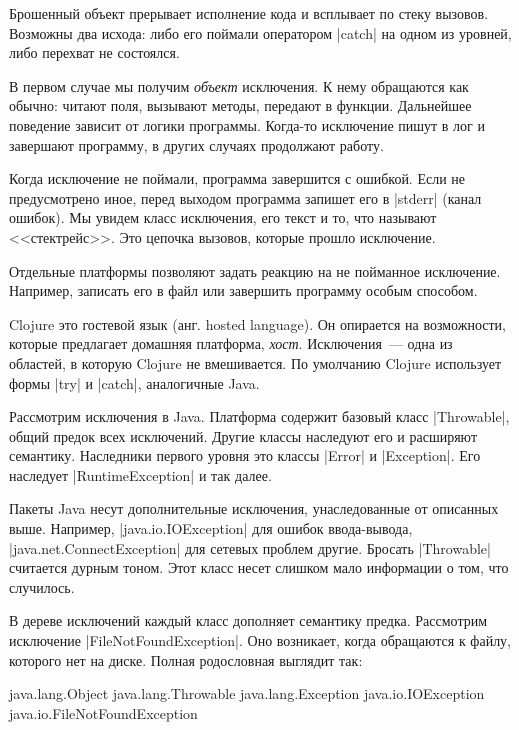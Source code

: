 Брошенный объект прерывает исполнение кода и всплывает по стеку
вызовов. Возможны два исхода: либо его поймали оператором \spverb|catch| на
одном из уровней, либо перехват не состоялся.

В первом случае мы получим \emph{объект} исключения. К нему обращаются как
обычно: читают поля, вызывают методы, передают в функции. Дальнейшее поведение
зависит от логики программы. Когда-то исключение пишут в лог и завершают
программу, в других случаях продолжают работу.

Когда исключение не поймали, программа завершится с ошибкой. Если не
предусмотрено иное, перед выходом программа запишет его в \spverb|stderr| (канал
ошибок). Мы увидем класс исключения, его текст и то, что называют
<<стектрейс>>. Это цепочка вызовов, которые прошло исключение.

Отдельные платформы позволяют задать реакцию на не пойманное
исключение. Например, записать его в файл или завершить программу особым
способом.

Clojure это гостевой язык (анг. hosted language). Он опирается на возможности,
которые предлагает домашняя платформа, \emph{хост}.  Исключения~--- одна из
областей, в которую Clojure не вмешивается. По умолчанию Clojure использует
формы \spverb|try| и \spverb|catch|, аналогичные Java.

Рассмотрим исключения в Java. Платформа содержит базовый класс
\spverb|Throwable|, общий предок всех исключений. Другие классы наследуют его и
расширяют семантику. Наследники первого уровня это классы \spverb|Error| и
\spverb|Exception|. Его наследует \spverb|RuntimeException| и так далее.


Пакеты Java несут дополнительные исключения, унаследованные от описанных
выше. Например, \spverb|java.io.IOException| для ошибок ввода-вывода,
\spverb|java.net.ConnectException| для сетевых проблем другие. Бросать
\spverb|Throwable| считается дурным тоном. Этот класс несет слишком мало
информации о том, что случилось.

В дереве исключений каждый класс дополняет семантику предка. Рассмотрим
исключение \spverb|FileNotFoundException|. Оно возникает, когда обращаются к
файлу, которого нет на диске. Полная родословная выглядит так:

\begin{english}
  \begin{text}
java.lang.Object
  java.lang.Throwable
    java.lang.Exception
      java.io.IOException
        java.io.FileNotFoundException
  \end{text}
\end{english}

